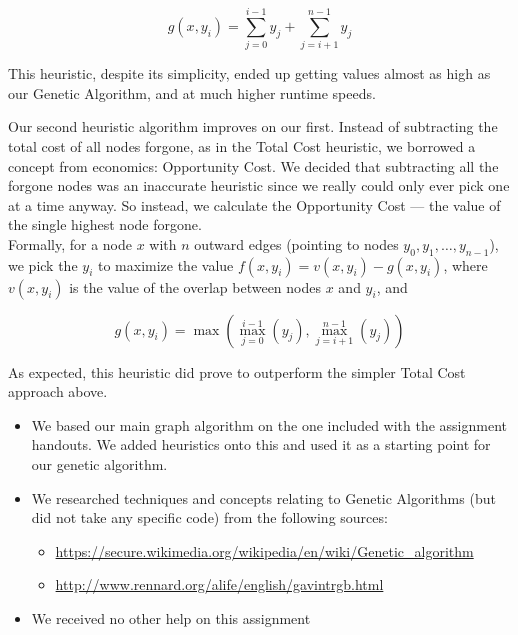 \documentclass{article}
\newcommand{\geneticwikiurl}{\url{https://secure.wikimedia.org/wikipedia/en/wiki/Genetic_algorithm}}
\begin{document}
\[ g \left( x, y_{i} \right) = \sum_{j = 0}^{i - 1} y_{j} + \sum_{j = i + 1}^{n - 1} y_{j} \]

This heuristic, despite its simplicity, ended up getting values almost as high as our Genetic Algorithm, and at much higher runtime speeds.

Our second heuristic algorithm improves on our first. Instead of subtracting the total cost of all nodes forgone, as in the Total Cost heuristic, we borrowed a concept from economics: Opportunity Cost. We decided that subtracting all the forgone nodes was an inaccurate heuristic since we really could only ever pick one at a time anyway. So instead, we calculate the Opportunity Cost --- the value of the single highest node forgone. \\

Formally, for a node \( x \) with \( n \) outward edges (pointing to nodes \( y_{0}, y_{1}, \ldots, y_{n - 1} \)), we pick the \( y_{i} \) to maximize the value \( f \left( x, y_{i} \right) = v \left( x, y_{i} \right) - g \left( x, y_{i} \right) \), where \( v \left( x, y_{i} \right) \) is the value of the overlap between nodes \( x \) and \( y_{i} \), and

\[ g \left( x, y_{i} \right) = \max \left( \max_{j = 0}^{i - 1} \left( y_{j} \right), \max_{j = i + 1}^{n - 1} \left( y_{j} \right) \right) \]

As expected, this heuristic did prove to outperform the simpler Total Cost approach above.

\begin{itemize}
    \item We based our main graph algorithm on the one included with the assignment handouts. We added heuristics onto this and used it as a starting point for our genetic algorithm.
    \item We researched techniques and concepts relating to Genetic Algorithms (but did not take any specific code) from the following sources:
        \begin{itemize}
            \item \geneticwikiurl
            \item \url{http://www.rennard.org/alife/english/gavintrgb.html}
        \end{itemize}
    \item We received no other help on this assignment
\end{itemize}
\end{document}
